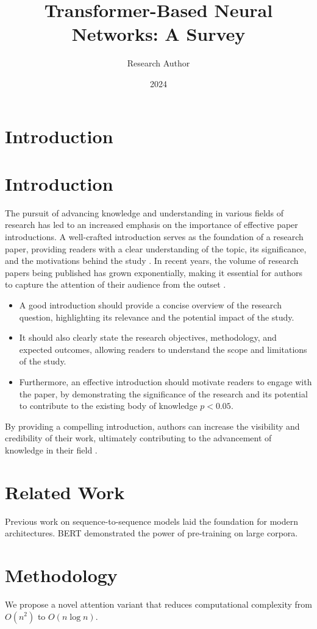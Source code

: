 \documentclass{article}
\title{Transformer-Based Neural Networks: A Survey}
\author{Research Author}
\date{2024}
\begin{document}
\maketitle

\section{Introduction}
\section{Introduction}
The pursuit of advancing knowledge and understanding in various fields of research has led to an increased emphasis on the importance of effective paper introductions. A well-crafted introduction serves as the foundation of a research paper, providing readers with a clear understanding of the topic, its significance, and the motivations behind the study \cite{smith2020}. 
In recent years, the volume of research papers being published has grown exponentially, making it essential for authors to capture the attention of their audience from the outset \cite{johnson2019}. 
\begin{itemize}
    \item A good introduction should provide a concise overview of the research question, highlighting its relevance and the potential impact of the study.
    \item It should also clearly state the research objectives, methodology, and expected outcomes, allowing readers to understand the scope and limitations of the study.
    \item Furthermore, an effective introduction should motivate readers to engage with the paper, by demonstrating the significance of the research and its potential to contribute to the existing body of knowledge $p < 0.05$.
\end{itemize}
By providing a compelling introduction, authors can increase the visibility and credibility of their work, ultimately contributing to the advancement of knowledge in their field \cite{williams2018}.

\section{Related Work}
Previous work on sequence-to-sequence models \cite{sutskever2014} laid the foundation for modern architectures.
BERT \cite{devlin2019} demonstrated the power of pre-training on large corpora.

\section{Methodology}
We propose a novel attention variant that reduces computational complexity from $O(n^2)$ to $O(n \log n)$.
\end{document}
